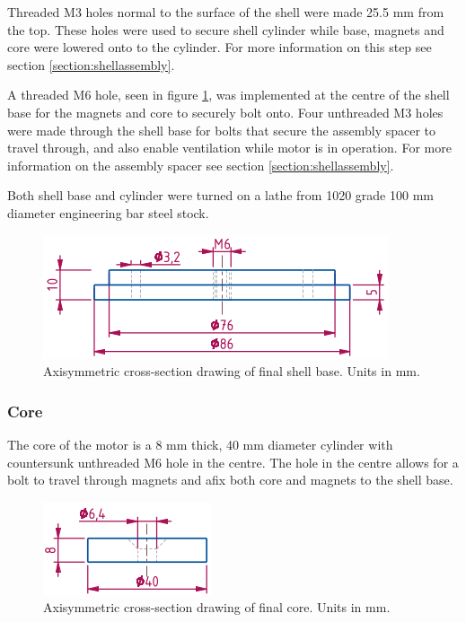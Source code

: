 \documentclass[a4paper,12pt]{article}
\begin{document}
Threaded M3 holes normal to the surface of the shell were made 25.5 mm from the top. These holes were used to secure shell cylinder while base, magnets and core were lowered onto to the cylinder. For more information on this step see section \ref{section:shellassembly}.

A threaded M6 hole, seen in figure \ref{fg:shellbase}, was implemented at the centre of the shell base for the magnets and core to securely bolt onto. Four unthreaded M3 holes were made through the shell base for bolts that secure the assembly spacer to travel through, and also enable ventilation while motor is in operation. For more information on the assembly spacer see section \ref{section:shellassembly}.

Both shell base and cylinder were turned on a lathe from 1020 grade 100 mm diameter engineering bar steel stock.

\begin{figure}[h!]
    \centering
    \includegraphics[scale=0.5]{shellbase.png}
    \caption{Axisymmetric cross-section drawing of final shell base. Units in mm.}
    \label{fg:shellbase}
\end{figure}

\subsubsection{Core}

The core of the motor is a 8 mm thick, 40 mm diameter cylinder with countersunk unthreaded M6 hole in the centre. The hole in the centre allows for a bolt to travel through magnets and afix both core and magnets to the shell base.

\begin{figure}[h!]
    \centering
    \includegraphics[scale=0.5]{core.png}
    \caption{Axisymmetric cross-section drawing of final core. Units in mm.}
    \label{fg:core}
\end{figure}
\end{document}
